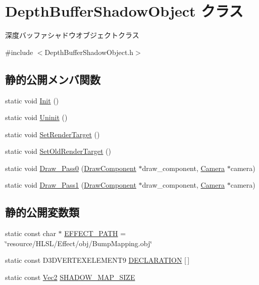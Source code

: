 \hypertarget{class_depth_buffer_shadow_object}{}\section{Depth\+Buffer\+Shadow\+Object クラス}
\label{class_depth_buffer_shadow_object}


深度バッファシャドウオブジェクトクラス  




{\ttfamily \#include $<$Depth\+Buffer\+Shadow\+Object.\+h$>$}

\subsection*{静的公開メンバ関数}
\begin{DoxyCompactItemize}
\item 
static void \mbox{\hyperlink{class_depth_buffer_shadow_object_a03e23f51e5e68babc7a1a42d0fedfba0}{Init}} ()
\item 
static void \mbox{\hyperlink{class_depth_buffer_shadow_object_a6f5e6542143cffef6b7a9e69f6c9cd94}{Uninit}} ()
\item 
static void \mbox{\hyperlink{class_depth_buffer_shadow_object_ac575084492645de134c6f1990ed7d2dc}{Set\+Render\+Target}} ()
\item 
static void \mbox{\hyperlink{class_depth_buffer_shadow_object_a2ac079b069c8f60b8d681868b9afce89}{Set\+Old\+Render\+Target}} ()
\item 
static void \mbox{\hyperlink{class_depth_buffer_shadow_object_a7916c03b90a01c71a9050e721cf6810c}{Draw\+\_\+\+Pass0}} (\mbox{\hyperlink{class_draw_component}{Draw\+Component}} $\ast$draw\+\_\+component, \mbox{\hyperlink{class_camera}{Camera}} $\ast$camera)
\item 
static void \mbox{\hyperlink{class_depth_buffer_shadow_object_a4bf8a72a447aa6ff150f3fef630ab448}{Draw\+\_\+\+Pass1}} (\mbox{\hyperlink{class_draw_component}{Draw\+Component}} $\ast$draw\+\_\+component, \mbox{\hyperlink{class_camera}{Camera}} $\ast$camera)
\end{DoxyCompactItemize}
\subsection*{静的公開変数類}
\begin{DoxyCompactItemize}
\item 
static const char $\ast$ \mbox{\hyperlink{class_depth_buffer_shadow_object_aaa0b1c0ca424614c5cf7368f00fa5fa0}{E\+F\+F\+E\+C\+T\+\_\+\+P\+A\+TH}} = \char`\"{}resource/H\+L\+SL/Effect/obj/Bump\+Mapping.\+obj\char`\"{}
\item 
static const D3\+D\+V\+E\+R\+T\+E\+X\+E\+L\+E\+M\+E\+N\+T9 \mbox{\hyperlink{class_depth_buffer_shadow_object_a9238d9843ca8654d67809dfbd5600137}{D\+E\+C\+L\+A\+R\+A\+T\+I\+ON}} \mbox{[}$\,$\mbox{]}
\item 
static const \mbox{\hyperlink{_vector3_d_8h_a5ef6e95dfc5f9d3820b71772d99bbc25}{Vec2}} \mbox{\hyperlink{class_depth_buffer_shadow_object_aa7a8ac55e3de545dacb0cfde57fd1017}{S\+H\+A\+D\+O\+W\+\_\+\+M\+A\+P\+\_\+\+S\+I\+ZE}}
\end{DoxyCompactItemize}


